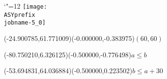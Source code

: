 \setlength{\unitlength}{1pt}%
\makeatletter%
\let\ASYencoding\f@encoding%
\let\ASYfamily\f@family%
\let\ASYseries\f@series%
\let\ASYshape\f@shape%
\makeatother%
{\catcode`"=12%
\texttt{[image: \\ASYprefix\\jobname-5\_0]}%
}%
%
\fontsize{6.000000}{7.200000}\selectfont%
\usefont{\ASYencoding}{\ASYfamily}{\ASYseries}{\ASYshape}%
\ASYalign(-24.900785,61.771009)(-0.000000,-0.383975){$(60,60)$}%
%
\fontsize{6.000000}{7.200000}\selectfont%
\ASYalign(-80.750210,6.326125)(-0.500000,-0.776498){$a\le b$}%
%
\fontsize{6.000000}{7.200000}\selectfont%
\ASYalign(-53.694831,64.036884)(-0.500000,0.223502){$b\le a+30$}%
